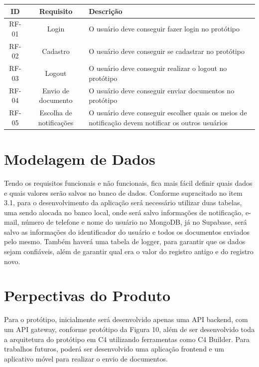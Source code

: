 \begin{table}[h!]
    \centering
    \begin{tabular}{|c|c|m{8cm}|}
        \hline
        \textbf{ID} & \textbf{Requisito} & \textbf{Descrição} \\ \hline
        RF-01 & Login & O usuário deve conseguir fazer login no protótipo \\ \hline
        RF-02 & Cadastro & O usuário deve conseguir se cadastrar no protótipo \\ \hline
        RF-03 & Logout & O usuário deve conseguir realizar o logout no protótipo \\ \hline
        RF-04 & Envio de documento & O usuário deve conseguir enviar documentos no protótipo \\ \hline
        RF-05 & Escolha de notificações & O usuário deve conseguir escolher quais os meios de notificação devem notificar os outros usuários \\ \hline
    \end{tabular}\label{tab:table2}
\end{table}


\section{Modelagem de Dados}

Tendo os requisitos funcionais e não funcionais, fica mais fácil definir quais dados
e quais valores serão salvos no banco de dados.
Conforme supracitado no item 3.1, para o desenvolvimento da aplicação será necessário utilizar duas tabelas, uma sendo alocada no banco
local, onde será salvo informações de notificação, e-mail, número de telefone e nome do usuário
no MongoDB, já no Supabase, será salvo as informações do identificador do usuário e todos os documentos enviados pelo mesmo.
Também haverá uma tabela de logger, para garantir que os dados sejam confiáveis, além de garantir qual era o valor do registro antigo e do registro novo.

\section{Perpectivas do Produto}

Para o protótipo, inicialmente será desenvolvido apenas uma API backend, com um
API gateway, conforme protótipo da Figura 10, além de ser desenvolvido toda a arquitetura do
protótipo em C4 utilizando ferramentas como C4 Builder.
Para trabalhos futuros, poderá ser
desenvolvido uma aplicação frontend e um aplicativo móvel para realizar o envio de documentos.

